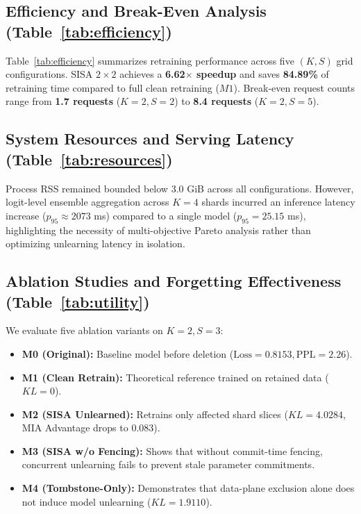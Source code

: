 \documentclass[10pt,journal,compsoc]{IEEEtran}
\begin{document}






\subsection{Efficiency and Break-Even Analysis (Table~\ref{tab:efficiency})}
Table~\ref{tab:efficiency} summarizes retraining performance across five $(K, S)$ grid configurations. SISA $2\times2$ achieves a \textbf{6.62$\times$ speedup} and saves \textbf{84.89\%} of retraining time compared to full clean retraining ($M1$). Break-even request counts range from \textbf{1.7 requests} ($K=2, S=2$) to \textbf{8.4 requests} ($K=2, S=5$).

\subsection{System Resources and Serving Latency (Table~\ref{tab:resources})}
Process RSS remained bounded below 3.0 GiB across all configurations. However, logit-level ensemble aggregation across $K=4$ shards incurred an inference latency increase ($p_{95} \approx 2073$ ms) compared to a single model ($p_{95} = 25.15$ ms), highlighting the necessity of multi-objective Pareto analysis rather than optimizing unlearning latency in isolation.

\subsection{Ablation Studies and Forgetting Effectiveness (Table~\ref{tab:utility})}
We evaluate five ablation variants on $K=2, S=3$:
\begin{itemize}
    \item \textbf{M0 (Original):} Baseline model before deletion ($\text{Loss}=0.8153, \text{PPL}=2.26$).
    \item \textbf{M1 (Clean Retrain):} Theoretical reference trained on retained data ($KL = 0$).
    \item \textbf{M2 (SISA Unlearned):} Retrains only affected shard slices ($KL = 4.0284$, MIA Advantage drops to $0.083$).
    \item \textbf{M3 (SISA w/o Fencing):} Shows that without commit-time fencing, concurrent unlearning fails to prevent stale parameter commitments.
    \item \textbf{M4 (Tombstone-Only):} Demonstrates that data-plane exclusion alone does not induce model unlearning ($KL = 1.9110$).
\end{itemize}
\end{document}
